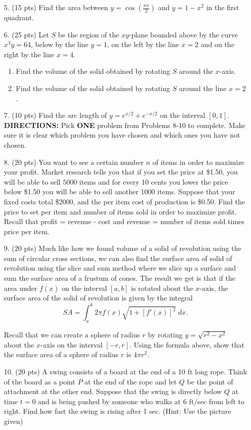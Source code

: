 \documentclass[11pt,reqno]{article}
\theoremstyle{definition}
\begin{document}
\begin{enumerate}
\begin{enumerate}
		\end{enumerate}
		\newpage
		\item[5.] (15 pts) Find the area between $y = \cos\left(\frac{\pi x}{2}\right)$ and $y = 1 - x^2$ in the first quadrant. 
		\newpage
		\item[6.] (25 pts) Let $S$ be the region of the $xy$-plane bounded above by the curve $x^3y = 64$, below by the line $y = 1$, on the left by the line $x = 2$ and on the right by the line $x = 4$. 
		\begin{enumerate}
			\item Find the volume of the solid obtained by rotating $S$ around the $x$-axis. 
			\vspace{12cm}
			\item Find the volume of the solid obtained by rotating $S$ around the line $x = 2$. 
		\end{enumerate}
		\newpage
		\item[7.] (10 pts) Find the arc length of $y = e^{x/2} + e^{-x/2}$ on the interval $[0, 1]$. 
		\newpage
		\textbf{DIRECTIONS:} Pick \textbf{ONE} problem from Problems 8-10 to complete. Make sure it is clear which problem you have chosen and which ones you have not chosen. 
		\item[8.] (20 pts) You want to see a certain number $n$ of items in order to maximize your profit. Market research tells you that if you set the price at \$1.50, you will be able to sell $5000$ items and for every 10 cents you lower the price below \$1.50 you will be able to sell another 1000 items. Suppose that your fixed costs total \$2000, and the per item cost of production is \$0.50. Find the price to set per item and number of items sold in order to maximize profit. Recall that profit = revenue - cost and revenue = number of items sold times price per item.
		\newpage
		\item[9.] (20 pts) Much like how we found volume of a solid of revolution using the sum of circular cross sections, we can also find the surface area of solid of revolution using the slice and sum method where we slice up a surface and sum the surface area of a frustum of cones. The result we get is that if the area under $f(x)$ on the interval $[a, b]$ is rotated about the $x$-axis, the surface area of the solid of revolution is given by the integral 
		$$ SA = \int_{a}^{b} 2\pi f(x) \sqrt{1 + [f'(x)]^2} \; dx.$$
		
		Recall that we can create a sphere of radius $r$ by rotating $y = \sqrt{r^2 - x^2}$ about the $x$-axis on the interval $[-r, r]$. Using the formula above, show that the surface area of a sphere of radius $r$ is $4 \pi r^2$. 
		\newpage
		\item[10.] (20 pts) A swing consists of a board at the end of a 10 ft long rope. Think of the board as a point $P$ at the end of the rope and let $Q$ be the point of attachment at the other end. Suppose that the swing is directly below $Q$ at time $t = 0$ and is being pushed by someone who walks at 6 ft/sec from left to right. Find how fast the swing is rising after 1 sec. (Hint: Use the picture given) 
		

\end{enumerate}
\end{document}
